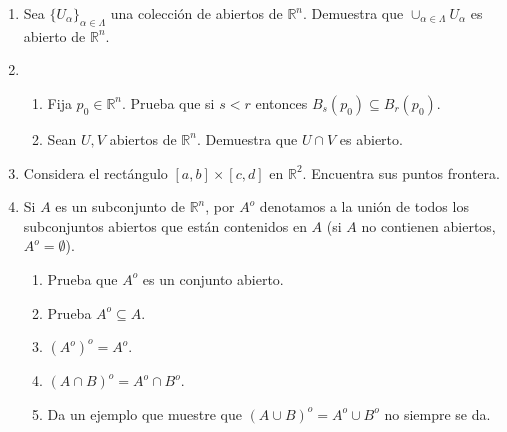 \documentclass{article}
\theoremstyle{definition}
\begin{document}
\begin{enumerate}
\item Sea $\{U_\alpha\}_{\alpha \in \Lambda}$ una colecci\'on de abiertos de $\mathbb{R}^n$. Demuestra que
$\cup_{\alpha \in \Lambda}U_\alpha$ es abierto de $\mathbb{R}^n$.

\item 
	\begin{enumerate}
	\item Fija $p_0\in \mathbb{R}^n$. Prueba que si $s<r$ entonces $B_s(p_0) \subseteq B_r(p_0)$.
	
	\item Sean $U, V$ abiertos de $\mathbb{R}^n$. Demuestra que $U\cap V$ es abierto.
	
	\end{enumerate}

	\item Considera el rect\'angulo $[a,b]\times [c,d]$ en $\mathbb{R}^2$. Encuentra sus puntos frontera.	
	
	\item Si $A $ es un subconjunto de $\mathbb{R}^n$, por $A^o$ denotamos a la uni\'on de todos los subconjuntos
	abiertos que est\'an contenidos en $A$ (si $A$ no contienen abiertos, $A^o=\emptyset$). 
	
	\begin{enumerate} 
	\item Prueba  que
	$A^o$ es un conjunto abierto. 

	\item Prueba $A^o \subseteq A$.
	\item $(A^o)^o=A^o$.
	\item $(A\cap B)^o=A^o \cap B^o$.
	\item Da un ejemplo que muestre que $(A\cup B)^o=A^o\cup B^o$ no siempre se da.
\end{enumerate}	

  \end{enumerate}
  


  
       
\end{document}
